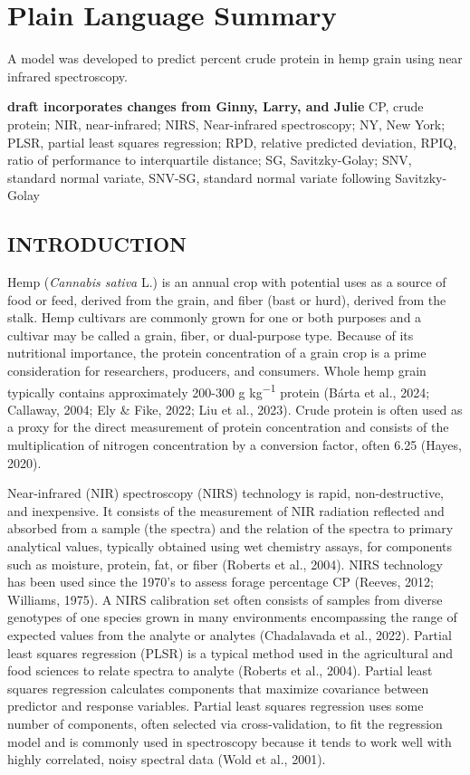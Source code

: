 \documentclass[
]{agujournal2019}
\begin{document}
\section*{Plain Language Summary}
A model was developed to predict percent crude protein in hemp grain
using near infrared spectroscopy.




\textbf{draft incorporates changes from Ginny, Larry, and Julie} CP,
crude protein; NIR, near-infrared; NIRS, Near-infrared spectroscopy; NY,
New York; PLSR, partial least squares regression; RPD, relative
predicted deviation, RPIQ, ratio of performance to interquartile
distance; SG, Savitzky-Golay; SNV, standard normal variate, SNV-SG,
standard normal variate following Savitzky-Golay

\subsection{INTRODUCTION}\label{introduction}

Hemp (\emph{Cannabis sativa} L.) is an annual crop with potential uses
as a source of food or feed, derived from the grain, and fiber (bast or
hurd), derived from the stalk. Hemp cultivars are commonly grown for one
or both purposes and a cultivar may be called a grain, fiber, or
dual-purpose type. Because of its nutritional importance, the protein
concentration of a grain crop is a prime consideration for researchers,
producers, and consumers. Whole hemp grain typically contains
approximately 200-300 g kg\textsuperscript{−1} protein (Bárta et al.,
2024; Callaway, 2004; Ely \& Fike, 2022; Liu et al., 2023). Crude
protein is often used as a proxy for the direct measurement of protein
concentration and consists of the multiplication of nitrogen
concentration by a conversion factor, often 6.25 (Hayes, 2020).

Near-infrared (NIR) spectroscopy (NIRS) technology is rapid,
non-destructive, and inexpensive. It consists of the measurement of NIR
radiation reflected and absorbed from a sample (the spectra) and the
relation of the spectra to primary analytical values, typically obtained
using wet chemistry assays, for components such as moisture, protein,
fat, or fiber (Roberts et al., 2004). NIRS technology has been used
since the 1970's to assess forage percentage CP (Reeves, 2012; Williams,
1975). A NIRS calibration set often consists of samples from diverse
genotypes of one species grown in many environments encompassing the
range of expected values from the analyte or analytes (Chadalavada et
al., 2022). Partial least squares regression (PLSR) is a typical method
used in the agricultural and food sciences to relate spectra to analyte
(Roberts et al., 2004). Partial least squares regression calculates
components that maximize covariance between predictor and response
variables. Partial least squares regression uses some number of
components, often selected via cross-validation, to fit the regression
model and is commonly used in spectroscopy because it tends to work well
with highly correlated, noisy spectral data (Wold et al., 2001).
\end{document}

